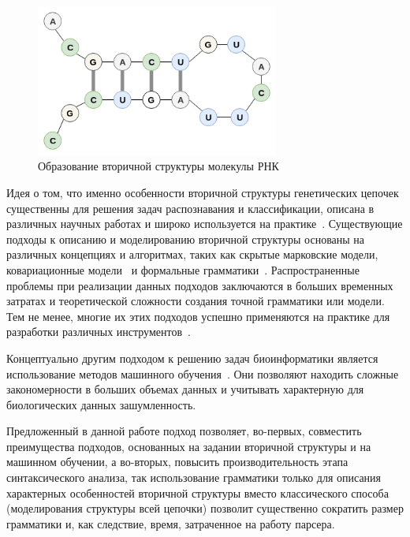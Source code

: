 \documentclass[14pt]{matmex-diploma-custom}
\begin{document}
\begin{figure}[h]
\begin{center}
\centering
\includegraphics[width=8cm]{molekula.png}
\caption{Образование вторичной структуры молекулы РНК}
\label{molekula}
\end{center}
\end{figure}    
Идея о том, что именно особенности вторичной структуры генетических цепочек существенны для решения задач распознавания и классификации, описана в различных научных работах и широко используется на практике~\cite{miladi2017rnascclust, vrehakova2014variation}.
Существующие подходы к описанию и моделированию вторичной структуры основаны на различных концепциях и алгоритмах, таких как скрытые марковские модели, ковариационные модели~\cite{EddyDurbin} и формальные грамматики~\cite{GrammarsRNA,PCFG,LWPCFG}. Распространенные проблемы при реализации данных подходов заключаются в больших временных затратах и теоретической сложности создания точной грамматики или модели. Тем не менее, многие их этих подходов успешно применяются на практике для разработки различных инструментов~\cite{hmmer,infernal}.

Концептуально другим подходом к решению задач биоинформатики является использование методов машинного обучения~\cite{Humidor,ANN}. Они позволяют находить сложные закономерности в больших объемах данных и учитывать характерную для биологических данных зашумленность.

Предложенный в данной работе подход позволяет, во-первых, совместить преимущества подходов, основанных на задании вторичной структуры и на машинном обучении, а во-вторых, повысить производительность этапа синтаксического анализа, так использование грамматики только для описания характерных особенностей вторичной структуры вместо классического способа (моделирования структуры всей цепочки) позволит существенно сократить размер грамматики и, как следствие, время, затраченное на работу парсера.
\end{document}
